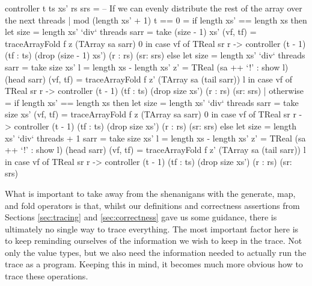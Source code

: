 \begin{haskell}[caption=Segmented fold, label=lst:segmented, gobble=12]
                    controller t ts xs' rs srs =
                        -- If we can evenly distribute the rest of the array over the next threads
                        | mod (length xs' + 1) t == 0 =
                            if   length xs' == length xs
                            then let size = length xs' `div` threads
                                     sarr = take (size - 1) xs'
                                     (vf, tf) = traceArrayFold f z (TArray sa sarr) 0
                                 in  case vf of
                                     TReal sr r -> controller (t - 1) (tf : ts)
                                        (drop (size - 1) xs') (r : rs) (sr: srs)
                            else let size = length xs' `div` threads
                                     sarr = take size xs'
                                     l    = length xs - length xs'
                                     z'   = TReal (sa ++ `!' : show l) (head sarr)
                                     (vf, tf) = traceArrayFold f z' (TArray sa (tail sarr)) l
                                 in  case vf of
                                     TReal sr r -> controller (t - 1) (tf : ts) 
                                        (drop size xs') (r : rs) (sr: srs)
                        | otherwise               =
                            if   length xs' == length xs
                            then let size = length xs' `div` threads
                                     sarr = take size xs'
                                     (vf, tf) = traceArrayFold f z (TArray sa sarr) 0
                                 in  case vf of
                                     TReal sr r -> controller (t - 1) (tf : ts)
                                        (drop size xs') (r : rs) (sr: srs)
                            else let size = length xs' `div` threads + 1
                                     sarr = take size xs'
                                     l    = length xs - length xs'
                                     z'   = TReal (sa ++ `!' : show l) (head sarr)
                                     (vf, tf) = traceArrayFold f z' (TArray sa (tail sarr)) l
                                 in  case vf of
                                     TReal sr r -> controller (t - 1) (tf : ts)
                                        (drop size xs') (r : rs) (sr: srs)
        \end{haskell}

        What is important to take away from the shenanigans with the generate, map, and fold operators is that, whilst our definitions and correctness assertions from Sections \ref{sec:tracing} and \ref{sec:correctness} gave us some guidance, there is ultimately no single way to trace everything.
        The most important factor here is to keep reminding ourselves of the information we wish to keep in the trace.
        Not only the value types, but we also need the information needed to actually run the trace as a program.
        Keeping this in mind, it becomes much more obvious how to trace these operations.
